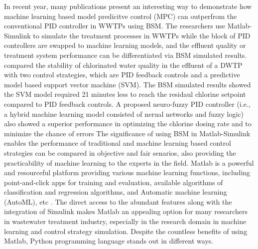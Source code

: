 In recent year, many publications present an interesting way to demonstrate how machine learning based model predicitve control (MPC) can outperfrom the conventional PID controller in WWTPs using BSM. The researchers use Matlab-Simulink to simulate the treatment processes in WWTPs while the block of PID controllers are swapped to machine learning models, and the effluent quality or treatment system performance can be differentiated via BSM simulated results. \citet{wangModelPredictiveControl2020} compared the stability of chlorinated water quality in the effluent of a DWTP with two control strategies, which are PID feedback controls and a predictive model based support vector machine (SVM). The BSM simulated results showed the SVM model required 21 minutes less to reach the residaul chlorine setpoint compared to PID feedback controls. A proposed neuro-fuzzy PID controller (i.e., a hybrid machine learning model consisted of nerual networks and fuzzy logic) also showed a superior performance in optimizing the chlorine dosing rate and to minimize the chance of errors \citep{hongApplicationNeurofuzzyPID2012} The significance of using BSM in Matlab-Simulink enables the performance of traditional and machine learning based control strategies can be compared in objective and fair senarios, also providing the practicability of machine learning to the experts in the field. Matlab is a powerful and resourceful platform providing various machine learning functions, including point-and-click apps for training and evaluation, available algorithms of classification and regression algorithms, and Automatic machine learning (AutoML), etc \citep{mathworksMATLABMachineLearning2022}. The direct access to the abundant features along with the integration of Simulink makes Matlab an appealing option for many researchers in wastewater treatment industry, especially in the research domain in machine learning and control strategy simulation. Despite the countless benefits of using Matlab, Python programming language stands out in different ways.

